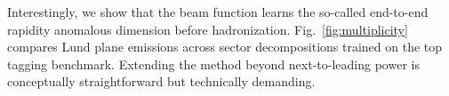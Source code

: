 Interestingly, we show that the beam function learns the so-called
end-to-end rapidity anomalous dimension before hadronization.
Fig.~\ref{fig:multiplicity} compares Lund plane emissions across sector
decompositions trained on the top tagging benchmark. Extending the
method beyond next-to-leading power is conceptually straightforward but
technically demanding.

